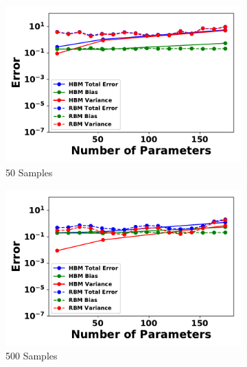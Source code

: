 \documentclass[letterpaper]{article} %
\begin{document}
        \begin{figure}[ht]
          \centering
          \begin{subfigure}[b]{0.495\textwidth}
              \centering
              \includegraphics[width=\textwidth]{./HBM_vs_RBM_Error_vs_NParameters_Samples50-eps-converted-to.pdf}
              \caption{50 Samples}
          \end{subfigure}
          \begin{subfigure}[b]{0.495\textwidth}
              \centering
              \includegraphics[width=\textwidth]{./HBM_vs_RBM_Error_vs_NParameters_Samples500-eps-converted-to.pdf}
              \caption{500 Samples}
          \end{subfigure}
          \begin{subfigure}[b]{0.495\textwidth}
              \centering

\end{subfigure}
\end{figure}
\end{document}
